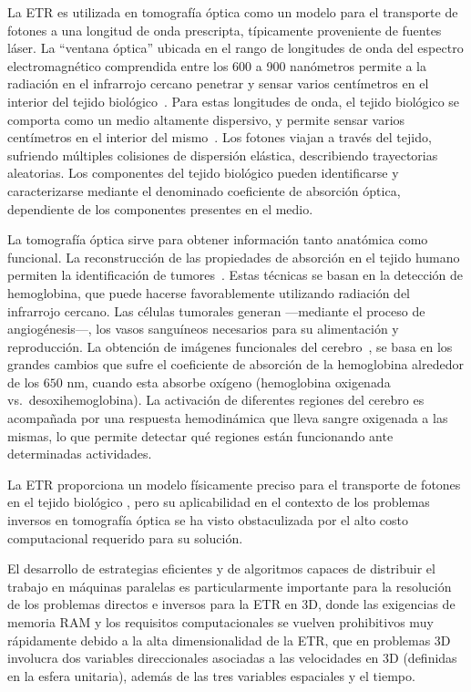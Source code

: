 La ETR es utilizada 
 en tomografía óptica como
 un modelo para el transporte de fotones a una longitud de onda prescripta, 
 típicamente proveniente de fuentes láser.
 La ``ventana óptica'' ubicada en el rango de longitudes de onda del espectro electromagnético comprendida entre los 600 a 900 nanómetros permite a la radiación en el 
 infrarrojo cercano penetrar y sensar varios centímetros en el interior del tejido biológico~\cite{Boas2001}. 
 Para estas longitudes de onda, el tejido 
 biológico se comporta como un medio altamente dispersivo, y 
 permite sensar varios centímetros en el interior del mismo~\cite{Boas2001}.
Los fotones viajan a través del tejido, sufriendo múltiples colisiones 
 de dispersión elástica, describiendo trayectorias aleatorias.
 Los componentes del tejido biológico pueden identificarse y caracterizarse
 mediante el denominado coeficiente de absorción óptica,  dependiente 
 de los componentes presentes en el medio.
 
La tomografía óptica sirve para obtener información tanto anatómica como funcional.
La reconstrucción de las propiedades de absorción en el tejido humano 
 permiten la identificación de tumores~\cite{Zhu2005, Zhu2010, Fujii2016b}.
Estas técnicas se basan en la detección de hemoglobina, que puede hacerse 
favorablemente utilizando radiación del infrarrojo cercano.
Las células tumorales generan ---mediante el proceso de angiogénesis---, 
los vasos sanguíneos necesarios para su alimentación y reproducción.
La obtención de imágenes funcionales del cerebro~\cite{Boas2001, bluestone2001, Arridge1999}, se basa en los grandes cambios 
que sufre el coeficiente de absorción de la hemoglobina 
alrededor de los $650$ nm, cuando esta absorbe oxígeno 
(hemoglobina oxigenada vs.~desoxihemoglobina). 
 La activación de diferentes regiones del cerebro 
 es acompañada por una respuesta hemodinámica que lleva sangre oxigenada 
 a las mismas, lo que permite detectar qué regiones están funcionando 
 ante determinadas actividades. 

La ETR proporciona un
modelo físicamente preciso para el transporte de fotones en el tejido biológico
\cite{Klose2009, Arridge2009}, pero su aplicabilidad en el contexto de
los problemas inversos en tomografía óptica se ha visto obstaculizada por el alto costo computacional requerido para su solución. 

El desarrollo de estrategias eficientes y de algoritmos capaces de distribuir el trabajo en máquinas paralelas es particularmente importante para la
resolución de los problemas directos e inversos para la ETR en 3D, donde las exigencias 
de memoria RAM y
los requisitos computacionales se vuelven prohibitivos muy rápidamente
debido a la alta dimensionalidad de la ETR, que en problemas 3D
involucra dos variables direccionales asociadas a las velocidades en 3D (definidas 
en la esfera unitaria), además de las tres variables espaciales y el tiempo. 

